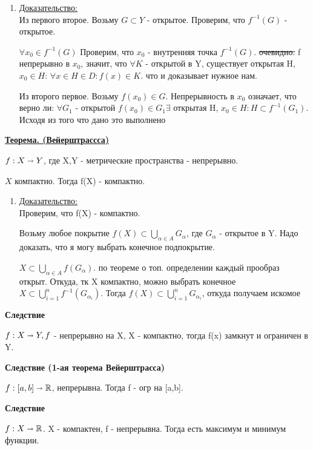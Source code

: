 \documentclass{article}
\newcommand{\thmm}[1]{\underline{\textbf{#1}}}
\newcommand{\prooff}[1]{{\underline{Доказательство:}} \\ }
\begin{document}
\begin{enumerate}
    \item[] \prooff{}
    Из первого второе. Возьму $G \subset Y$ - открытое. Проверим, что $f^{-1}(G)$ - открытое.

    $\forall x_0 \in f^{-1}(G)$ Проверим, что $x_0$ - внутренняя точка $f^{-1}(G)$. \sout{очевидно.} f непрерывно в $x_0$, значит, что $\forall K$ - открытой в Y, существует открытая H, $x_0 \in H$: $\forall x \in H \in D: f(x) \in K$. что и доказывает нужное нам.

    Из второго первое. Возьму $f(x_0) \in G$. Непрерывность в $x_0$ означает, что верно ли: $\forall G_1$ - открытой $f(x_0) \in G_1 \exists$ открытая H, $x_0 \in H: H \subset f^{-1}(G_1)$. Исходя из того что дано это выполнено
\end{enumerate}

\thmm{Теорема. (Вейерштрассса)}

$f: X \shortrightarrow Y$, где X,Y - метрические пространства - непрерывно.

$X$ компактно. Тогда f(X) - компактно.

\begin{enumerate}
    \item[] \prooff{}
    Проверим, что f(X) - компактно.

    Возьму любое покрытие $f(X) \subset \bigcup\limits_{\alpha \in A} G_\alpha$, где $G_\alpha$ - открытое в Y. Надо доказать, что я могу выбрать конечное подпокрытие.

    $X \subset \bigcup\limits_{\alpha \in A} f(G_{\alpha})$. по теореме о топ. определении каждый прообраз открыт. Откуда, тк X компактно,  можно выбрать конечное
    $X \subset \bigcup\limits_{i=1}^n f^{-1}(G_{\alpha_i})$.
    Тогда $f(X) \subset \bigcup\limits_{i=1}^n G_{\alpha_i}$, откуда получаем искомое
    
\end{enumerate}

\textbf{Следствие}

$f: X \shortrightarrow Y, f$ - непрерывно на X, X - компактно, тогда f(x) замкнут и ограничен в Y.

\textbf{Следствие (1-ая теорема Вейерштрасса)}

$f: [a,b] \shortrightarrow \mathbb{R}$, непрерывна. Тогда f - огр на [a,b].

\textbf{Следствие}

$f: X \shortrightarrow \mathbb{R}$. X - компактен, f - непрерывна. Тогда есть максимум и минимум функции.
\end{document}
